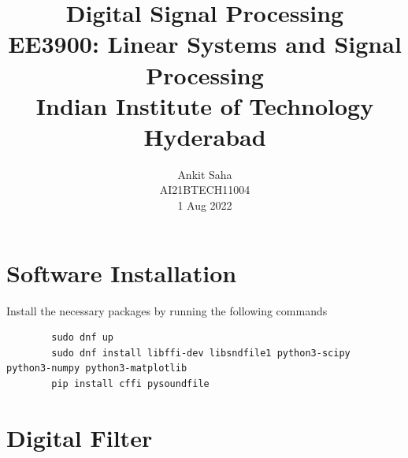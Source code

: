 \documentclass[journal,12pt,twocolumn]{IEEEtran}
\title{Digital Signal Processing \\ \Large EE3900: Linear Systems and Signal Processing \\ \large Indian Institute of Technology Hyderabad}
\author{Ankit Saha \\ \normalsize AI21BTECH11004 \\ \vspace*{20pt} \normalsize 1 Aug 2022}
\numberwithin{equation}{section}
\begin{document}
	\maketitle
	
	\section{Software Installation}
	Install the necessary packages by running the following commands
	\begin{lstlisting}
		sudo dnf up
		sudo dnf install libffi-dev libsndfile1 python3-scipy  python3-numpy python3-matplotlib 
		pip install cffi pysoundfile 
	\end{lstlisting}

	\section{Digital Filter}
\end{document}
